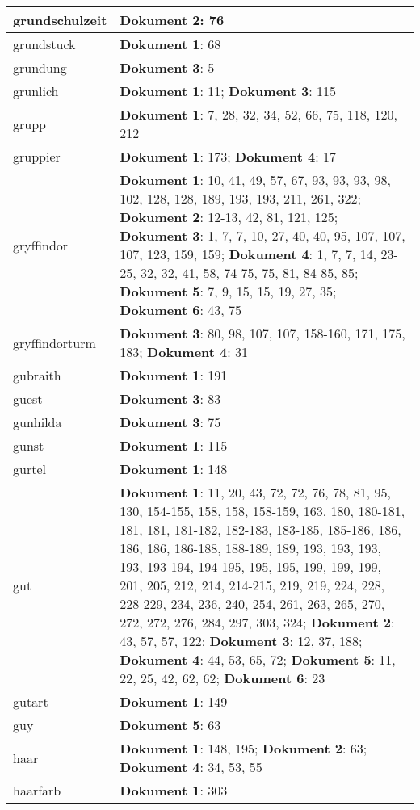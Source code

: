 \documentclass[a5paper]{article}
\begin{document}
\begin{longtable}[l]{|l|p{3in}|}
\hline
grundschulzeit & \textbf{Dokument 2}: 76 \\
\hline
grundstuck & \textbf{Dokument 1}: 68 \\
\hline
grundung & \textbf{Dokument 3}: 5 \\
\hline
grunlich & \textbf{Dokument 1}: 11; \textbf{Dokument 3}: 115 \\
\hline
grupp & \textbf{Dokument 1}: 7, 28, 32, 34, 52, 66, 75, 118, 120, 212 \\
\hline
gruppier & \textbf{Dokument 1}: 173; \textbf{Dokument 4}: 17 \\
\hline
gryffindor & \textbf{Dokument 1}: 10, 41, 49, 57, 67, 93, 93, 93, 98, 102, 128, 128, 189, 193, 193, 211, 261, 322; \textbf{Dokument 2}: 12-13, 42, 81, 121, 125; \textbf{Dokument 3}: 1, 7, 7, 10, 27, 40, 40, 95, 107, 107, 107, 123, 159, 159; \textbf{Dokument 4}: 1, 7, 7, 14, 23-25, 32, 32, 41, 58, 74-75, 75, 81, 84-85, 85; \textbf{Dokument 5}: 7, 9, 15, 15, 19, 27, 35; \textbf{Dokument 6}: 43, 75 \\
\hline
gryffindorturm & \textbf{Dokument 3}: 80, 98, 107, 107, 158-160, 171, 175, 183; \textbf{Dokument 4}: 31 \\
\hline
gubraith & \textbf{Dokument 1}: 191 \\
\hline
guest & \textbf{Dokument 3}: 83 \\
\hline
gunhilda & \textbf{Dokument 3}: 75 \\
\hline
gunst & \textbf{Dokument 1}: 115 \\
\hline
gurtel & \textbf{Dokument 1}: 148 \\
\hline
gut & \textbf{Dokument 1}: 11, 20, 43, 72, 72, 76, 78, 81, 95, 130, 154-155, 158, 158, 158-159, 163, 180, 180-181, 181, 181, 181-182, 182-183, 183-185, 185-186, 186, 186, 186, 186-188, 188-189, 189, 193, 193, 193, 193, 193-194, 194-195, 195, 195, 199, 199, 199, 201, 205, 212, 214, 214-215, 219, 219, 224, 228, 228-229, 234, 236, 240, 254, 261, 263, 265, 270, 272, 272, 276, 284, 297, 303, 324; \textbf{Dokument 2}: 43, 57, 57, 122; \textbf{Dokument 3}: 12, 37, 188; \textbf{Dokument 4}: 44, 53, 65, 72; \textbf{Dokument 5}: 11, 22, 25, 42, 62, 62; \textbf{Dokument 6}: 23 \\
\hline
gutart & \textbf{Dokument 1}: 149 \\
\hline
guy & \textbf{Dokument 5}: 63 \\
\hline
haar & \textbf{Dokument 1}: 148, 195; \textbf{Dokument 2}: 63; \textbf{Dokument 4}: 34, 53, 55 \\
\hline
haarfarb & \textbf{Dokument 1}: 303 \\

\end{longtable}
\end{document}
